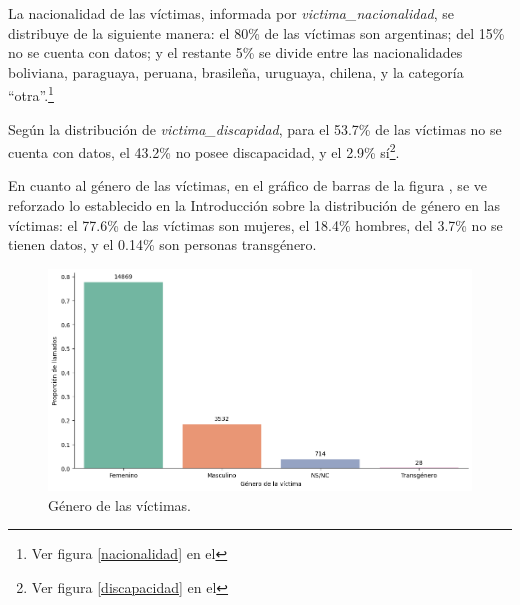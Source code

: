 \documentclass[10 pt]{article}
\begin{document}


La nacionalidad de las víctimas, informada por \textit{victima\_nacionalidad}, se distribuye de la siguiente manera: el 80\% de las víctimas son argentinas; del 15\% no se cuenta con datos; y el restante 5\% se divide entre las nacionalidades boliviana, paraguaya, peruana, brasileña, uruguaya, chilena, y la categoría “otra”.\footnote{Ver figura \ref{nacionalidad} en el }

Según la distribución de \textit{victima\_discapidad}, para el 53.7\% de las víctimas no se cuenta con datos, el 43.2\% no posee discapacidad, y el 2.9\% sí\footnote{Ver figura \ref{discapacidad} en el }. 


En cuanto al género de las víctimas, en el gráfico de barras de la figura , se ve reforzado lo establecido en la Introducción sobre la distribución de género en las víctimas: el 77.6\% de las víctimas son mujeres, el 18.4\% hombres, del 3.7\% no se tienen datos, y el 0.14\% son personas transgénero. 

\begin{figure}[H]
    \begin{center}
    \includegraphics[scale=.5]{images/latex_genero_victima.png}
    \caption{Género de las víctimas.}
    \label{genero}
    \end{center}
    \end{figure}
\end{document}

